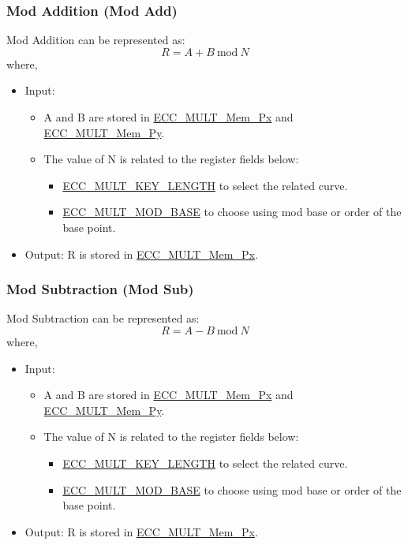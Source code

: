 \documentclass[main\_\_EN.tex]{subfiles}
\begin{document}
\subsubsection{Mod Addition (Mod Add)}
Mod Addition can be represented as:
\[
R = A + B \ \textrm{mod}\ N
\]
where,
\begin{itemize}
    \item Input:
    \begin{itemize}
        \item A and B are stored in \hyperref[tab:ecc-memory]{ECC\_MULT\_Mem\_Px} and \hyperref[tab:ecc-memory]{ECC\_MULT\_Mem\_Py}.
        \item The value of N is related to the register fields below:
        \begin{itemize}
            \item \hyperref[fielddesc:ECCMULTKEYLENGTH]{ECC\_MULT\_KEY\_LENGTH} to select the related curve.
            \item \hyperref[fielddesc:ECCMULTMODBASE]{ECC\_MULT\_MOD\_BASE} to choose using mod base or order of the base point.
        \end{itemize}
    \end{itemize}
    \item Output: R is stored in \hyperref[tab:ecc-memory]{ECC\_MULT\_Mem\_Px}.
\end{itemize}

\subsubsection{Mod Subtraction (Mod Sub)}
Mod Subtraction can be represented as:
\[
R = A - B \ \textrm{mod}\ N
\]
where,
\begin{itemize}
    \item Input:
    \begin{itemize}
        \item A and B are stored in \hyperref[tab:ecc-memory]{ECC\_MULT\_Mem\_Px} and \hyperref[tab:ecc-memory]{ECC\_MULT\_Mem\_Py}.
        \item The value of N is related to the register fields below:
        \begin{itemize}
            \item \hyperref[fielddesc:ECCMULTKEYLENGTH]{ECC\_MULT\_KEY\_LENGTH} to select the related curve.
            \item \hyperref[fielddesc:ECCMULTMODBASE]{ECC\_MULT\_MOD\_BASE} to choose using mod base or order of the base point.
        \end{itemize}
    \end{itemize}
    \item Output: R is stored in \hyperref[tab:ecc-memory]{ECC\_MULT\_Mem\_Px}.
\end{itemize}
\end{document}
